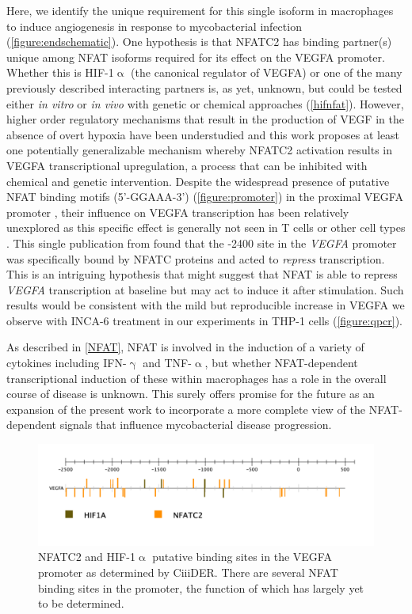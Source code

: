 Here, we identify the unique requirement for this single isoform in macrophages to induce angiogenesis in response to mycobacterial infection (\autoref{figure:endschematic}). One hypothesis is that NFATC2 has binding partner(s) unique among NFAT isoforms required for its effect on the VEGFA promoter. Whether this is HIF\hyp{}1$\upalpha$ (the canonical regulator of VEGFA) or one of the many previously described interacting partners is, as yet, unknown, but could be tested either \textit{in vitro} or \textit{in vivo} with genetic or chemical approaches (\autoref{hifnfat}). However, higher order regulatory mechanisms that result in the production of VEGF in the absence of overt hypoxia have been understudied and this work proposes at least one potentially generalizable mechanism whereby NFATC2 activation results in VEGFA transcriptional upregulation, a process that can be inhibited with chemical and genetic intervention. Despite the widespread presence of putative NFAT binding motifs (5'\hyp{}GGAAA\hyp{}3') (\autoref{figure:promoter}) in the proximal VEGFA promoter \citep{Gearing2019}, their influence on VEGFA transcription has been relatively unexplored as this specific effect is generally not seen in T cells or other cell types \citep{Chang2004}. This single publication from \citet{Chang2004} found that the \hyp{}2400 site in the \textit{VEGFA} promoter was specifically bound by NFATC proteins and acted to \textit{repress} transcription. This is an intriguing hypothesis that might suggest that NFAT is able to repress \textit{VEGFA} transcription at baseline but may act to induce it after stimulation. Such results would be consistent with the mild but reproducible increase in VEGFA we observe with INCA\hyp{}6 treatment in our experiments in THP\hyp{}1 cells (\autoref{figure:qpcr}). 

As described in \autoref{NFAT}, NFAT is involved in the induction of a variety of cytokines including IFN\hyp{}$\upgamma$ and TNF\hyp{}$\upalpha$, but whether NFAT\hyp{}dependent transcriptional induction of these within macrophages has a role in the overall course of disease is unknown. This surely offers promise for the future as an expansion of the present work to incorporate a more complete view of the NFAT\hyp{}dependent signals that influence mycobacterial disease progression.

\begin{figure}
\centering
\includegraphics[width=\textwidth]{images/vegfapromoter.pdf}
\caption{NFATC2 and HIF\hyp{}1$\upalpha$ putative binding sites in the VEGFA promoter as determined by CiiiDER. There are several NFAT binding sites in the promoter, the function of which has largely yet to be determined.}
\label{figure:promoter}
\end{figure}

